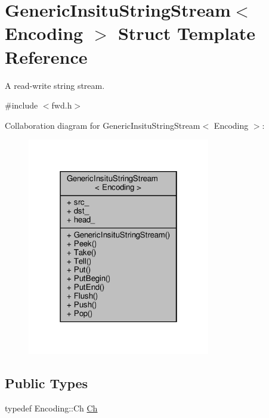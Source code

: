 \hypertarget{structGenericInsituStringStream}{}\section{Generic\+Insitu\+String\+Stream$<$ Encoding $>$ Struct Template Reference}
\label{structGenericInsituStringStream}


A read-\/write string stream.  




{\ttfamily \#include $<$fwd.\+h$>$}



Collaboration diagram for Generic\+Insitu\+String\+Stream$<$ Encoding $>$\+:
\nopagebreak
\begin{figure}[H]
\begin{center}
\leavevmode
\includegraphics[width=226pt]{structGenericInsituStringStream__coll__graph}
\end{center}
\end{figure}
\subsection*{Public Types}
\begin{DoxyCompactItemize}
\item 
typedef Encoding\+::\+Ch \hyperlink{structGenericInsituStringStream_a277308a58f551f11d0d9a20823702b5a}{Ch}
\end{DoxyCompactItemize}
